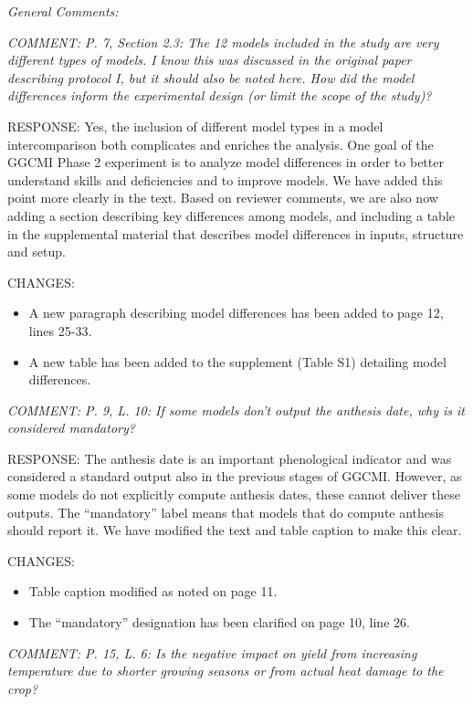 \documentclass[gmd, manuscript]{copernicus} %
\begin{document}
\smallskip

\textcolor{dark-gray}{\textit{General Comments:}}

\textcolor{dark-gray}{\textit{COMMENT: P. 7, Section 2.3: The 12 models included in the study are very different types of models. I know this was discussed in the original paper describing protocol I, but it should also be noted here. How did the model differences inform the experimental design (or limit the scope of the study)?}}

RESPONSE: Yes, the inclusion of different model types in a model intercomparison both complicates and enriches the analysis. One goal of the GGCMI Phase 2 experiment is to analyze model differences in order to better understand skills and deficiencies and to improve models. We have added this point more clearly in the text. Based on reviewer comments, we are also now adding a section describing key differences among models, and including a table in the supplemental material that describes model differences in inputs, structure and setup.
\smallskip

CHANGES:
\begin{itemize}
    \item A new paragraph describing model differences has been added to page 12, lines 25-33.
    \item A new table has been added to the supplement (Table S1) detailing model differences.
\end{itemize}

\smallskip
\textcolor{dark-gray}{\textit{COMMENT: P. 9, L. 10: If some models don’t output the anthesis date, why is it considered mandatory?}}

RESPONSE: The anthesis date is an important phenological indicator and was considered a standard output also in the previous stages of GGCMI. However, as some models do not explicitly compute anthesis dates, these cannot deliver these outputs. The “mandatory” label means that models that do compute anthesis should report it. We have modified the text and table caption to make this clear.
\smallskip

CHANGES:
\begin{itemize}
    \item Table caption modified as noted on page 11.
    \item The ``mandatory'' designation has been clarified on page 10, line 26. 
\end{itemize}

\smallskip

\textcolor{dark-gray}{\textit{COMMENT: P. 15, L. 6: Is the negative impact on yield from increasing temperature due to shorter growing seasons or from actual heat damage to the crop?}}
\end{document}
